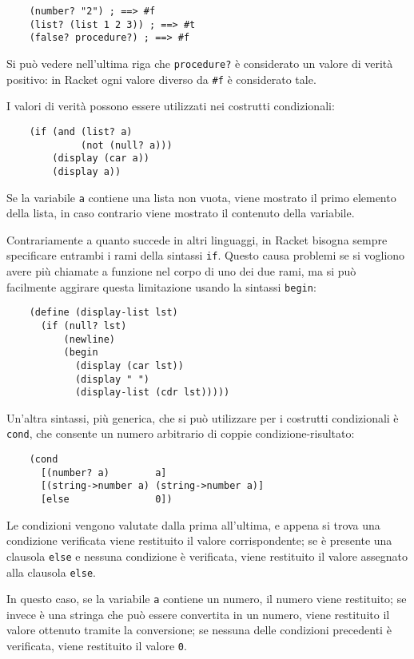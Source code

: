 \begin{lstlisting}
    (number? "2") ; ==> #f
    (list? (list 1 2 3)) ; ==> #t
    (false? procedure?) ; ==> #f
\end{lstlisting}

Si pu\`o vedere nell'ultima riga che \lstinline{procedure?} \`e
considerato un valore di verit\`a positivo: in Racket ogni valore
diverso da \lstinline{#f} \`e considerato tale.

I valori di verit\`a possono essere utilizzati nei costrutti
condizionali:

\begin{lstlisting}
    (if (and (list? a)
             (not (null? a)))
        (display (car a))
        (display a))
\end{lstlisting}

Se la variabile \lstinline{a} contiene una lista non vuota, viene
mostrato il primo elemento della lista, in caso contrario viene
mostrato il contenuto della variabile.

Contrariamente a quanto succede in altri linguaggi, in Racket bisogna
sempre specificare entrambi i rami della sintassi \lstinline{if}.
Questo causa problemi se si vogliono avere pi\`u chiamate a funzione
nel corpo di uno dei due rami, ma si pu\`o facilmente aggirare questa
limitazione usando la sintassi \lstinline{begin}:

\begin{lstlisting}
    (define (display-list lst)
      (if (null? lst)
          (newline)
          (begin
            (display (car lst))
            (display " ")
            (display-list (cdr lst)))))
\end{lstlisting}

Un'altra sintassi, pi\`u generica, che si pu\`o utilizzare per i
costrutti condizionali \`e \lstinline{cond}, che consente un numero
arbitrario di coppie condizione-risultato:

\begin{lstlisting}
    (cond
      [(number? a)        a]
      [(string->number a) (string->number a)]
      [else               0])
\end{lstlisting}

Le condizioni vengono valutate dalla prima all'ultima, e appena si
trova una condizione verificata viene restituito il valore
corrispondente; se \`e presente una clausola \lstinline{else} e
nessuna condizione \`e verificata, viene restituito il valore
assegnato alla clausola \lstinline{else}.

In questo caso, se la variabile \lstinline{a} contiene un numero, il
numero viene restituito; se invece \`e una stringa che pu\`o essere
convertita in un numero, viene restituito il valore ottenuto tramite
la conversione; se nessuna delle condizioni precedenti \`e verificata,
viene restituito il valore \lstinline{0}.

